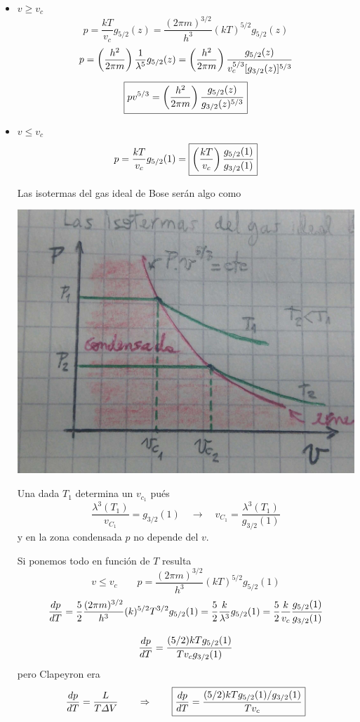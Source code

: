 \documentclass[10pt,oneside]{CBFT_book}
\begin{document}
\begin{itemize}
 \item $ v \geq v_c $
 \[
	p = \frac{ kT }{v_c} g_{5/2}(z) = \frac{ ( 2 \pi m )^{3/2} }{ h^3 } ( kT )^{5/2} g_{5/2}(z)
 \]
 \[
	p = \left( \frac{ h^2 }{ 2\pi m } \right)\frac{1}{\lambda^5}g_{5/2}(z) = 
	\left( \frac{ h^2 }{ 2\pi m } \right) \frac{g_{5/2}(z)}{v_c^{5/3} [g_{3/2}(z)]^{5/3}}
 \]
 \[
	\boxed{ p v^{5/3} = \left( \frac{ h^2 }{ 2\pi m } \right) \frac{g_{5/2}(z)}{ g_{3/2}(z)^{5/3}} }
 \]
 \item $ v \leq v_c$
 \[
	p = \frac{ kT }{v_c} g_{5/2}(1) = \boxed{ \left( \frac{ kT }{ v_c } \right) \frac{g_{5/2}(1)}{g_{3/2}(1)} }
 \]
 
 Las isotermas del gas ideal de Bose serán algo como 
 
  \includegraphics[scale=0.5]{images/1625626562707.jpg}
 
 Una dada $ T_1 $ determina un $v_{c_1}$ pués
 \[
	\frac{\lambda^3(T_1)}{v_{C_1}} = g_{3/2}(1) \quad \to \quad v_{C_1} = \frac{\lambda^3(T_1)}{g_{3/2}(1)} 
 \]
 y en la zona condensada $p$ no depende del $v$.
 
 
 Si ponemos todo en función de $T$ resulta 
 \[
	v \leq v_c \qquad p = \frac{ ( 2 \pi m )^{3/2} }{ h^3 } ( kT )^{5/2} g_{5/2}(1)
 \]
 \[
	\frac{d^{\hspace{-0.05em}} {p}}{d {T}^{\hspace{-0.05em}}} =   \frac{5}{2} \frac{ ( 2 \pi m )^{3/2} }{ h^3 }  ( k )^{5/2} T^{3/2} g_{5/2}(1) =
	\frac{5}{2} \frac{k}{\lambda^3} g_{5/2}(1) = \frac{5}{2} \frac{k}{v_c} \frac{g_{5/2}(1)}{g_{3/2}(1)}
 \]
  
 \[
	\frac{d^{\hspace{-0.05em}} { p }}{d { T }^{\hspace{-0.05em}}} = \frac{ ( 5/2 ) k T g_{5/2}(1) }{T v_c g_{3/2}(1) } 
 \]
 pero Clapeyron era
 \[
	\frac{d^{\hspace{-0.05em}} { p }}{d { T }^{\hspace{-0.05em}}} = \frac{ L }{ T \Delta V } \qquad \Rightarrow \qquad 
	\boxed{  \frac{d^{\hspace{-0.05em}} { p }}{d { T }^{\hspace{-0.05em}}} = \frac{ ( 5/2 ) k T g_{5/2}(1) / g_{3/2}(1) }{T v_c} }
 \]
 

\end{itemize}
\end{document}
